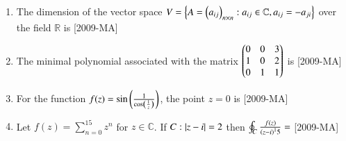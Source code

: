\documentclass[journal]{IEEEtran}
\begin{document}
\begin{enumerate}
\item The dimension of the vector space $V=\left\{A=\left(a_{ij}\right)_{n \times n}: a_{ij} \in \mathbb C,a_{ij}=-a_{ji}\right\}$ over the field $\mathbb R$ is \hfill{[2009-MA]}
\begin{enumerate}
\end{enumerate}

\item The minimal polynomial associated with the matrix $\begin{pmatrix}0&0&3\\1&0&2\\0&1&1\end{pmatrix}$ is \hfill{[2009-MA]}
\begin{enumerate}
\end{enumerate}

\item For the function $f(z)=\sin \left(\frac{1}{\cos \left(\frac{1}{z}\right)}\right)$, the point $z=0$ is \hfill{[2009-MA]}
\begin{enumerate}
\end{enumerate}

\item Let $f(z)=\sum _{n=0}^{15} z^{n}$ for $z \in \mathbb C$. If $C:\left\vert z-i\right\vert=2$ then $\oint_C
\frac{f(z)}{\left(z-i\right)^15}=$ \hfill{[2009-MA]}
\begin{enumerate}
\end{enumerate}


\end{enumerate}
\end{document}
